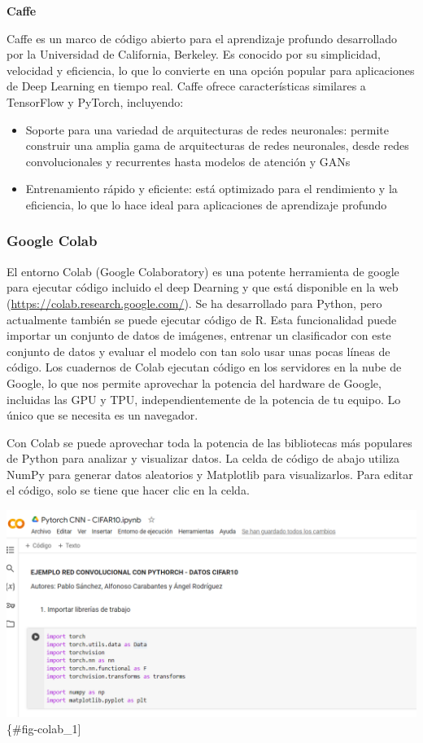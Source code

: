 \documentclass[
  a4paper,
  DIV=11,
  numbers=noendperiod]{scrreprt}
\providecommand{\tightlist}{%
  \setlength{\itemsep}{0pt}\setlength{\parskip}{0pt}}\usepackage{longtable,booktabs,array}
\begin{document}
\textbf{Caffe}

Caffe es un marco de código abierto para el aprendizaje profundo
desarrollado por la Universidad de California, Berkeley. Es conocido por
su simplicidad, velocidad y eficiencia, lo que lo convierte en una
opción popular para aplicaciones de Deep Learning en tiempo real. Caffe
ofrece características similares a TensorFlow y PyTorch, incluyendo:

\begin{itemize}
\tightlist
\item
  Soporte para una variedad de arquitecturas de redes neuronales:
  permite construir una amplia gama de arquitecturas de redes
  neuronales, desde redes convolucionales y recurrentes hasta modelos de
  atención y GANs
\item
  Entrenamiento rápido y eficiente: está optimizado para el rendimiento
  y la eficiencia, lo que lo hace ideal para aplicaciones de aprendizaje
  profundo
\end{itemize}

\subsubsection{Google Colab}\label{google-colab}

El entorno Colab (Google Colaboratory) es una potente herramienta de
google para ejecutar código incluido el deep Dearning y que está
disponible en la web (\url{https://colab.research.google.com/}). Se ha
desarrollado para Python, pero actualmente también se puede ejecutar
código de R. Esta funcionalidad puede importar un conjunto de datos de
imágenes, entrenar un clasificador con este conjunto de datos y evaluar
el modelo con tan solo usar unas pocas líneas de código. Los cuadernos
de Colab ejecutan código en los servidores en la nube de Google, lo que
nos permite aprovechar la potencia del hardware de Google, incluidas las
GPU y TPU, independientemente de la potencia de tu equipo. Lo único que
se necesita es un navegador.

Con Colab se puede aprovechar toda la potencia de las bibliotecas más
populares de Python para analizar y visualizar datos. La celda de código
de abajo utiliza NumPy para generar datos aleatorios y Matplotlib para
visualizarlos. Para editar el código, solo se tiene que hacer clic en la
celda.

\includegraphics{imagenes/capitulo1/colab_1.png}\{\#fig-colab\_1{]}
\end{document}

